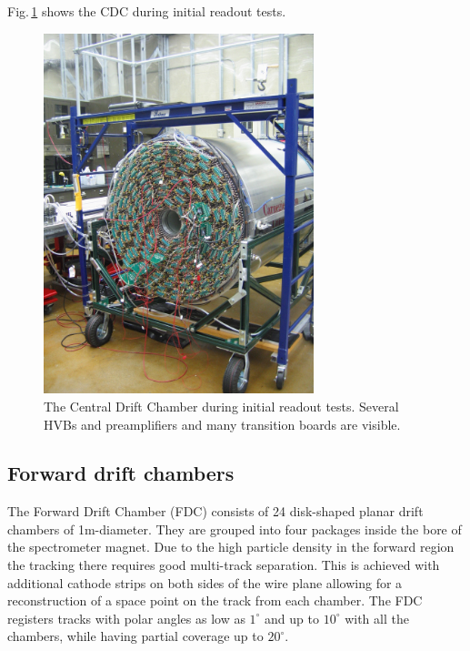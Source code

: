 Fig.\,\ref{fig:CDC_rhs}  shows the CDC during initial readout tests.
\begin{figure}[tbp]
\begin{center}
\includegraphics[width=0.7\textwidth]{figures/cdc_rhs.jpg}  
\caption{\label{fig:CDC_rhs}          
  The Central Drift Chamber during initial readout tests. Several HVBs and preamplifiers and many transition boards are visible.}
  \end{center}
\end{figure}


\subsection[Forward drift chambers (Lubomir)]{Forward drift chambers
\label{sec:fdc} }

The Forward Drift Chamber (FDC) consists of 24 disk-shaped planar drift chambers of 1m-diameter.
They are grouped into four packages inside the bore of the spectrometer magnet.
Due to the high particle density in the forward region the tracking there requires
good multi-track separation.
This is achieved with additional cathode strips on both sides of the wire plane allowing for a  reconstruction of a space point on the track from each chamber. 
The FDC registers tracks with polar angles as low as $1^\circ$ and up to $10^\circ $
with all the chambers, while having partial coverage up to $20^\circ$.

